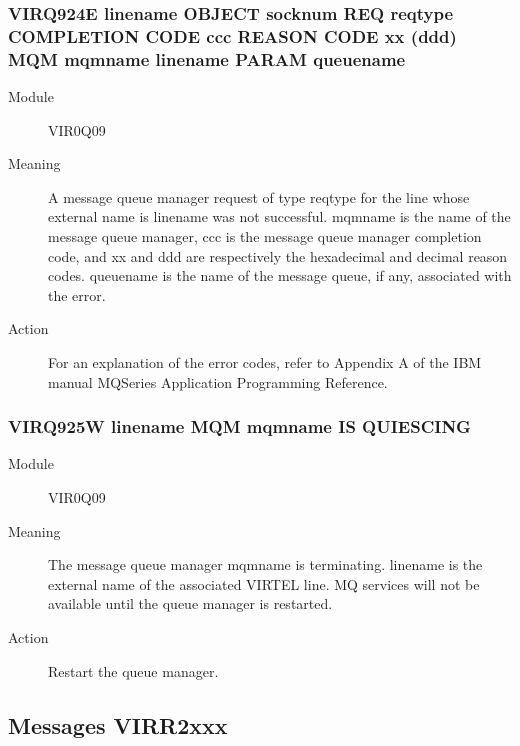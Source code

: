 \documentclass[letterpaper,10pt,english]{sphinxmanual}
\begin{document}
\subsubsection{VIRQ924E linename OBJECT socknum REQ reqtype COMPLETION CODE ccc REASON CODE xx (ddd) MQM mqmname \textbar{} linename PARAM queuename}
\label{\detokenize{messages:virq924e-linename-object-socknum-req-reqtype-completion-code-ccc-reason-code-xx-ddd-mqm-mqmname-linename-param-queuename}}\begin{description}
\item[{Module}] \leavevmode
VIR0Q09

\item[{Meaning}] \leavevmode
A message queue manager request of type reqtype for the line whose external name is linename was not successful. mqmname is the name of the message queue manager, ccc is the message queue manager completion code, and xx and ddd are respectively the hexadecimal and decimal reason codes. queuename is the name of the message queue, if any, associated with the error.

\item[{Action}] \leavevmode
For an explanation of the error codes, refer to Appendix A of the IBM manual MQSeries Application Programming Reference.

\end{description}


\subsubsection{VIRQ925W linename MQM mqmname IS QUIESCING}
\label{\detokenize{messages:virq925w-linename-mqm-mqmname-is-quiescing}}\begin{description}
\item[{Module}] \leavevmode
VIR0Q09

\item[{Meaning}] \leavevmode
The message queue manager mqmname is terminating. linename is the external name of the associated VIRTEL line. MQ services will not be available until the queue manager is restarted.

\item[{Action}] \leavevmode
Restart the queue manager.

\end{description}


\subsection{Messages VIRR2xxx}
\label{\detokenize{messages:messages-virr2xxx}}
\end{document}

